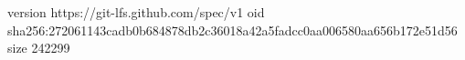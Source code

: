 version https://git-lfs.github.com/spec/v1
oid sha256:272061143cadb0b684878db2c36018a42a5fadcc0aa006580aa656b172e51d56
size 242299
